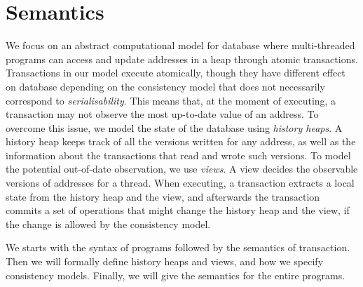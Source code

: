 \section{Semantics}
\label{sec:semantics}

We focus on an abstract computational model for database where multi-threaded programs can access and update addresses in a heap through atomic transactions. 
Transactions in our model execute atomically, though they have different effect on database depending on the consistency model that does not necessarily correspond to \emph{serialisability}. 
This means that, at the moment of executing, a transaction may not observe the most up-to-date value of an address. 
To overcome this issue, we model the state of the database using \emph{history heaps}. 
A history heap keeps track of all the versions written for any address, as well as the information about the transactions that read and wrote such versions. 
To model the potential out-of-date observation, we use \emph{views}.
A view decides the observable versions of addresses for a thread.
When executing, a transaction extracts a local state from the history heap and the view, and afterwards the transaction commits a set of operations that might change the history heap and the view, if the change is allowed by the consistency model.

We starts with the syntax of programs followed by the semantics of transaction.
Then we will formally define history heaps and views, and how we specify consistency models.
Finally, we will give the semantics for the entire programs.



%

